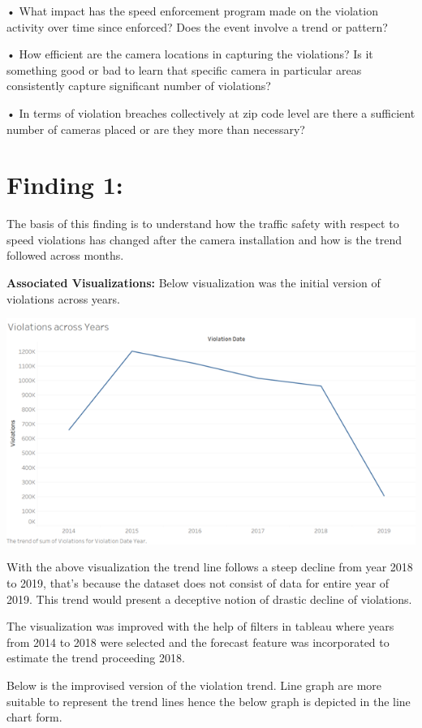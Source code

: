 \documentclass[]{book}
\begin{document}
• What impact has the speed enforcement program made on the violation activity over time since enforced? Does the event involve a trend or pattern?

• How efficient are the camera locations in capturing the violations? Is it something good or bad to learn that specific camera in particular areas consistently capture significant number of violations?

• In terms of violation breaches collectively at zip code level are there a sufficient number of cameras placed or are they more than necessary?

\hypertarget{finding-1}{%
\section{Finding 1:}\label{finding-1}}

The basis of this finding is to understand how the traffic safety with respect to speed violations has changed after the camera installation and how is the trend followed across months.

\textbf{Associated Visualizations:}
Below visualization was the initial version of violations across years.

\includegraphics{images/Image1.png}

With the above visualization the trend line follows a steep decline from year 2018 to 2019, that's because the dataset does not consist of data for entire year of 2019. This trend would present a deceptive notion of drastic decline of violations.

The visualization was improved with the help of filters in tableau where years from 2014 to 2018 were selected and the forecast feature was incorporated to estimate the trend proceeding 2018.

Below is the improvised version of the violation trend. Line graph are more suitable to represent the trend lines hence the below graph is depicted in the line chart form.
\end{document}
